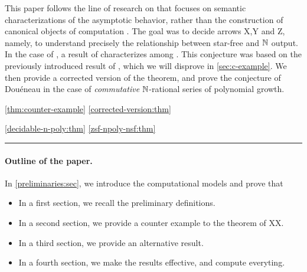 This paper follows the line of
research on  that focuses on semantic
characterizations of the asymptotic behavior, rather than the construction
of canonical objects of computation
\cite{doueneau2021pebble,doueneau2022hiding,LOPEZ23b}. The goal was to
decide arrows X,Y and Z, namely, to understand precisely the relationship
between star-free and $\mathbb{N}$ output. In the case of , a result of \citeauthor{KARH77} characterizes 
 among 
\cite{KARH77}.
This conjecture was based on the previously introduced result of
\textcite[Theorem 3.3]{KARH77}, which we will disprove in \cref{sec:c-example}.
We then provide a corrected version of the theorem, and prove the conjecture of
Douéneau in the case of \emph{commutative} $\mathbb{N}$-rational series of polynomial
growth.

\cref{thm:counter-example}
\cref{corrected-version:thm}

\cref{decidable-n-poly:thm}
\cref{zsf-npoly-nsf:thm}

\hrule


\paragraph*{Outline of the paper.}
In \cref{preliminaries:sec}, we introduce the computational models
and prove that 
\begin{itemize}
    \item In a first section, we recall the preliminary definitions.
    \item In a second section, we provide a counter example to the
        theorem of XX.
    \item In a third section, we provide an alternative result.
    \item In a fourth section, we make the results effective,
        and compute everyting.
\end{itemize}
